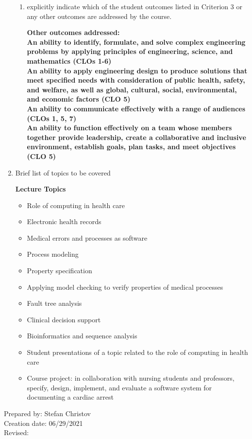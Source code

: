 \begin{enumerate}[1.]
\begin{enumerate}
\item explicitly indicate which of the student outcomes listed in Criterion 3 or any other outcomes are addressed by the course.\\
  {\bfseries
    Other outcomes addressed:\\
    An ability to identify, formulate, and solve complex engineering problems by applying principles of engineering, science, and mathematics (CLOs 1-6)\\
    An ability to apply engineering design to produce solutions that meet specified needs with consideration of public health, safety, and welfare, as well as global, cultural, social, environmental, and economic factors (CLO 5)\\
   An ability to communicate effectively with a range of audiences (CLOs 1, 5, 7)\\
   An ability to function effectively on a team whose members together provide leadership, create a collaborative and inclusive environment, establish goals, plan tasks, and meet objectives (CLO 5)

  }
\end{enumerate}

\item Brief list of topics to be covered\\
  {\bfseries
    Lecture Topics
    \begin{itemize}
      \item Role of computing in health care
      \item Electronic health records
      \item Medical errors and processes as software
      \item Process modeling
      \item Property specification
      \item Applying model checking to verify properties of medical processes 
      \item Fault tree analysis
      \item Clinical decision support
      \item Bioinformatics and sequence analysis
      \item Student presentations of a topic related to the role of computing in health care
      \item Course project: in collaboration with nursing students and professors, specify, design, implement, and evaluate a software system for documenting a cardiac arrest
    \end{itemize}
  }

\end{enumerate}

\noindent Prepared by: Stefan Christov\\
\noindent Creation date: 06/29/2021\\
\noindent Revised:\\
